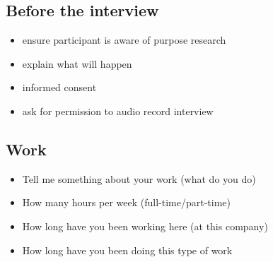 \subsection{Before the interview}
\begin{itemize}
\item 
ensure participant is aware of purpose research 
\item 
explain what will happen
\item 
informed consent
\item 
ask for permission to audio record interview
\end{itemize}
\subsection{Work}
\begin{itemize}
\item Tell me something about your work (what do you do)
\item  How many hours per week (full-time/part-time)
\item How long have you been working here (at this company) \item How long have you been doing this type of work
\end{itemize}
